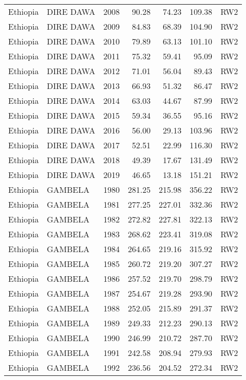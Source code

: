 \begin{longtable}{lllrrrl}
  Ethiopia & DIRE DAWA & 2008 & 90.28 & 74.23 & 109.38 & RW2 \\ 
  Ethiopia & DIRE DAWA & 2009 & 84.83 & 68.39 & 104.90 & RW2 \\ 
  Ethiopia & DIRE DAWA & 2010 & 79.89 & 63.13 & 101.10 & RW2 \\ 
  Ethiopia & DIRE DAWA & 2011 & 75.32 & 59.41 & 95.09 & RW2 \\ 
  Ethiopia & DIRE DAWA & 2012 & 71.01 & 56.04 & 89.43 & RW2 \\ 
  Ethiopia & DIRE DAWA & 2013 & 66.93 & 51.32 & 86.47 & RW2 \\ 
  Ethiopia & DIRE DAWA & 2014 & 63.03 & 44.67 & 87.99 & RW2 \\ 
  Ethiopia & DIRE DAWA & 2015 & 59.34 & 36.55 & 95.16 & RW2 \\ 
  Ethiopia & DIRE DAWA & 2016 & 56.00 & 29.13 & 103.96 & RW2 \\ 
  Ethiopia & DIRE DAWA & 2017 & 52.51 & 22.99 & 116.30 & RW2 \\ 
  Ethiopia & DIRE DAWA & 2018 & 49.39 & 17.67 & 131.49 & RW2 \\ 
  Ethiopia & DIRE DAWA & 2019 & 46.65 & 13.18 & 151.21 & RW2 \\ 
  Ethiopia & GAMBELA & 1980 & 281.25 & 215.98 & 356.22 & RW2 \\ 
  Ethiopia & GAMBELA & 1981 & 277.25 & 227.01 & 332.36 & RW2 \\ 
  Ethiopia & GAMBELA & 1982 & 272.82 & 227.81 & 322.13 & RW2 \\ 
  Ethiopia & GAMBELA & 1983 & 268.62 & 223.41 & 319.08 & RW2 \\ 
  Ethiopia & GAMBELA & 1984 & 264.65 & 219.16 & 315.92 & RW2 \\ 
  Ethiopia & GAMBELA & 1985 & 260.72 & 219.20 & 307.27 & RW2 \\ 
  Ethiopia & GAMBELA & 1986 & 257.52 & 219.70 & 298.79 & RW2 \\ 
  Ethiopia & GAMBELA & 1987 & 254.67 & 219.28 & 293.90 & RW2 \\ 
  Ethiopia & GAMBELA & 1988 & 252.05 & 215.89 & 291.37 & RW2 \\ 
  Ethiopia & GAMBELA & 1989 & 249.33 & 212.23 & 290.13 & RW2 \\ 
  Ethiopia & GAMBELA & 1990 & 246.99 & 210.72 & 287.70 & RW2 \\ 
  Ethiopia & GAMBELA & 1991 & 242.58 & 208.94 & 279.93 & RW2 \\ 
  Ethiopia & GAMBELA & 1992 & 236.56 & 204.52 & 272.34 & RW2 \\ 

\end{longtable}
